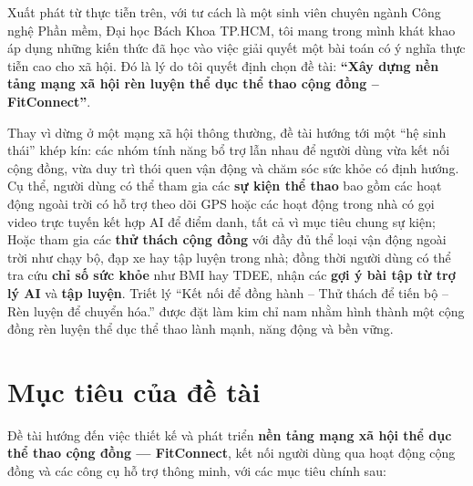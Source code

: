 Xuất phát từ thực tiễn trên, với tư cách là một sinh viên chuyên ngành Công nghệ Phần mềm, Đại học Bách Khoa TP.HCM, tôi mang trong mình khát khao áp dụng những kiến thức đã học vào việc giải quyết một bài toán có ý nghĩa thực tiễn cao cho xã hội. Đó là lý do tôi quyết định chọn đề tài: \textbf{``Xây dựng nền tảng mạng xã hội rèn luyện thể dục thể thao cộng đồng -- FitConnect''}.

Thay vì dừng ở một mạng xã hội thông thường, đề tài hướng tới một ``hệ sinh thái'' khép kín: các nhóm tính năng bổ trợ lẫn nhau để người dùng vừa kết nối cộng đồng, vừa duy trì thói quen vận động và chăm sóc sức khỏe có định hướng. Cụ thể, người dùng có thể tham gia các \textbf{sự kiện thể thao} bao gồm các hoạt động ngoài trời có hỗ trợ theo dõi GPS hoặc các hoạt động trong nhà có gọi video trực tuyến kết hợp AI để điểm danh, tất cả vì mục tiêu chung sự kiện; Hoặc tham gia các \textbf{thử thách cộng đồng} với đầy đủ thể loại vận động ngoài trời như chạy bộ, đạp xe hay tập luyện trong nhà; đồng thời người dùng có thể tra cứu \textbf{chỉ số sức khỏe} như BMI hay TDEE, nhận các \textbf{gợi ý bài tập từ trợ lý AI} và \textbf{tập luyện}. Triết lý “Kết nối để đồng hành – Thử thách để tiến bộ – Rèn luyện để chuyển hóa.” được đặt làm kim chỉ nam nhằm hình thành một cộng đồng rèn luyện thể dục thể thao lành mạnh, năng động và bền vững.

\section{Mục tiêu của đề tài}
\label{sec:intro:objectives}

Đề tài hướng đến việc thiết kế và phát triển \textbf{nền tảng mạng xã hội thể dục thể thao cộng đồng --- FitConnect}, kết nối người dùng qua hoạt động cộng đồng và các công cụ hỗ trợ thông minh, với các mục tiêu chính sau:

